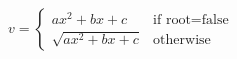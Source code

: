 \documentclass[a4paper]{article}
\begin{document}
\thispagestyle{empty}

\TeXtoEPS
\large
$ v = \left\{ \begin{array}{ll}
                 ax^2 + bx +c & \mbox{if root=false} \\
                 \sqrt{ax^2+bx+c} & \mbox{otherwise}
              \end{array} \right. $
\endTeXtoEPS
\end{document}
